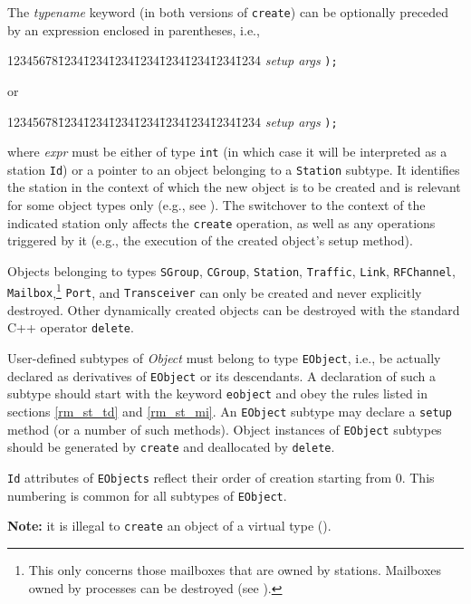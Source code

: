 The {\em typename\/} keyword (in both versions of {\tt create}) can be
optionally preceded by an expression enclosed in parentheses, i.e.,
{\tt\begin{tabbing}
12345678\=1234\=1234\=1234\=1234\=1234\=1234\=1234\=1234\kill
{} {\em setup args\/} {\tt );} \\
\end{tabbing}}
or
{\tt\begin{tabbing}
12345678\=1234\=1234\=1234\=1234\=1234\=1234\=1234\=1234\kill
{} {\em setup args\/} {\tt );}
\end{tabbing}}
\noindent
where {\em expr\/} must be either of type {\tt int} (in which case it will be
interpreted as a station {\tt Id})
or a pointer to an object belonging to a {\tt Station} subtype.
It identifies the
station in the context of which the new object is to be created and is
relevant for some object types only (e.g., see ).
The switchover to the context of the indicated station
only affects the {\tt create} operation, as well as any operations triggered
by it (e.g., the execution of the created object's setup method).

Objects belonging to types {\tt SGroup}, {\tt CGroup}, {\tt Station},
{\tt Traffic}, {\tt Link}, {\tt RFChannel}, {\tt Mailbox},\footnote{This only
concerns those mailboxes that are owned by stations.
Mailboxes owned by processes can be destroyed (see ).}
{\tt Port}, and
{\tt Transceiver} can only be created and never explicitly destroyed.
Other dynamically created
objects can be destroyed with the standard C++ operator {\tt delete}.

User-defined subtypes of {\em Object\/} must belong to type {\tt EObject}, i.e.,
be actually declared as derivatives of {\tt EObject} or its descendants.
A declaration of such a subtype should start with the keyword {\tt eobject}
and obey the rules listed in sections \ref{rm_st_td} and \ref{rm_st_mi}.
An {\tt EObject} subtype
may declare a {\tt setup} method (or a number of such methods).
Object instances of {\tt EObject} subtypes should be generated
by {\tt create} and deallocated by {\tt delete}.

{\tt Id} attributes of {\tt EObjects} reflect their order of
creation starting from 0.
This numbering is common for all subtypes of {\tt EObject}.

\medskip

\noindent
{\bf Note:} it is illegal to {\tt create} an object of a virtual type
().

